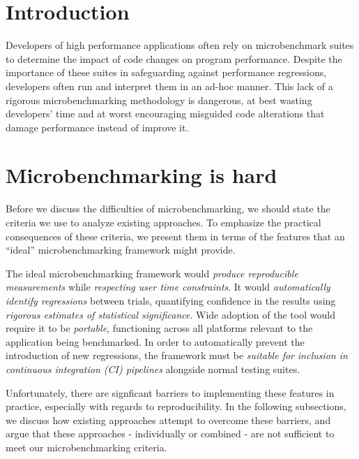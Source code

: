 \documentclass[conference]{IEEEtran}
\begin{document}
\IEEEpeerreviewmaketitle

\label{sec:intro}
\section{Introduction}

Developers of high performance applications often rely on microbenchmark suites to determine
the impact of code changes on program performance. Despite the importance of these suites in
safeguarding against performance regressions, developers often run and interpret them in an
ad-hoc manner. This lack of a rigorous microbenchmarking methodology is dangerous, at best
wasting developers' time and at worst encouraging misguided code alterations that damage
performance instead of improve it.


\label{sec:challenges}
\section{Microbenchmarking is hard}

Before we discuss the difficulties of microbenchmarking, we should state the criteria we use
to analyze existing approaches. To emphasize the practical consequences of these criteria,
we present them in terms of the features that an ``ideal'' microbenchmarking framework might
provide.

The ideal microbenchmarking framework would \textit{produce reproducible measurements} while
\textit{respecting user time constraints}. It would \textit{automatically identify
regressions} between trials, quantifying confidence in the results using \textit{rigorous
estimates of statistical significance}. Wide adoption of the tool would require it to be
\textit{portable}, functioning across all platforms relevant to the application being
benchmarked. In order to automatically prevent the introduction of new regressions, the
framework must be \textit{suitable for inclusion in continuous integration (CI) pipelines}
alongside normal testing suites.

Unfortunately, there are signficant barriers to implementing these features in practice,
especially with regards to reproducibility. In the following subsections, we discuss how
existing approaches attempt to overcome these barriers, and argue that these approaches -
individually or combined - are not sufficient to meet our microbenchmarking criteria.
\end{document}
